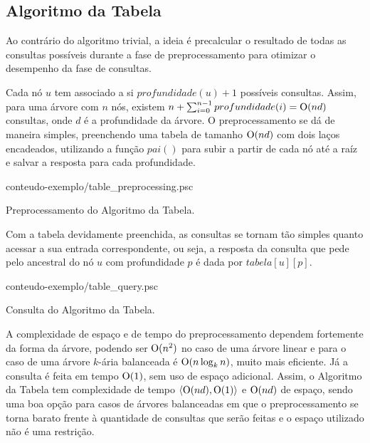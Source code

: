 \subsection{Algoritmo da Tabela}
Ao contrário do algoritmo trivial, a ideia é precalcular o resultado de todas
as consultas possíveis durante a fase de preprocessamento para otimizar o
desempenho da fase de consultas.

Cada nó $u$ tem associado a si $profundidade(u) + 1$ possíveis consultas. Assim, para uma
árvore com $n$ nós, existem $n + \sum_{i=0}^{n-1} profundidade(i) = \mathrm{O}(nd)$ consultas, onde $d$ é a profundidade da árvore.
O preprocessamento se dá de maneira simples, preenchendo uma tabela de tamanho
$\mathrm{O}(nd)$ com dois laços encadeados, utilizando a função $pai()$ para subir a partir
de cada nó até a raíz e salvar a resposta para cada profundidade.

\begin{program}[]
  
  {conteudo-exemplo/table_preprocessing.psc}

  \caption{Preprocessamento do Algoritmo da Tabela.\label{prog:tableproc}}
\end{program}

Com a tabela devidamente preenchida, as consultas se tornam tão simples quanto acessar
a sua entrada correspondente, ou seja, a resposta da consulta que pede pelo ancestral
do nó $u$ com profundidade $p$ é dada por $tabela[u][p]$. 

\begin{program}[h!]
  
  {conteudo-exemplo/table_query.psc}

  \caption{Consulta do Algoritmo da Tabela.\label{prog:tablequery}}
\end{program}

A complexidade de espaço e de tempo do preprocessamento dependem fortemente da forma da
árvore, podendo ser $\mathrm{O}(n^2)$ no caso de uma árvore linear e para o caso de uma
árvore $k$-ária balanceada é $\mathrm{O}(n \log_k n)$, muito mais eficiente. Já a consulta
é feita em tempo $\mathrm{O}(1)$, sem uso de espaço adicional. Assim, o Algoritmo da Tabela
tem complexidade de tempo $\langle \mathrm{O}(nd), \mathrm{O}(1) \rangle$ e $\mathrm{O}(nd)$ de espaço,
sendo uma boa opção para casos de árvores balanceadas em que o preprocessamento se torna
barato frente à quantidade de consultas que serão feitas e o espaço utilizado não é
uma restrição.


